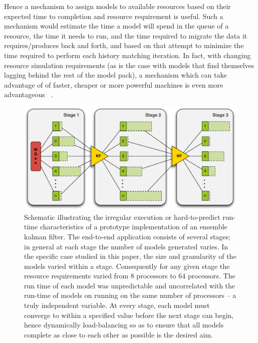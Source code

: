 \documentclass[conference,final]{IEEEtran}
\begin{document}
Hence a mechanism to assign models to available resources based on
their expected time to completion and resource requirement is useful.
Such a mechanism would estimate the time a model will spend in the
queue of a resource, the time it needs to run, and the time required
to migrate the data it requires/produces back and forth, and based on
that attempt to minimize the time required to perform each history
matching iteration.  In fact, with changing resource simulation
requirements (as is the case with models that find themselves lagging
behind the rest of the model pack), a mechanism which can take
advantage of of faster, cheaper or more powerful machines is even more
advantageous ~\cite{escience07}.

\begin{figure}
\begin{center}
\includegraphics*[scale=0.36,]{./figures/3StageKalmanFilter}
\end{center}
\caption{Schematic illustrating the irregular execution or
  hard-to-predict run-time characteristics of a prototype
  implementation of an ensemble kalman filter. The end-to-end
  application consists of several stages; in general at each stage the
  number of models generated varies. In the specific case studied in
  this paper, the size and granularity of the models varied within a
  stage. Consequently for any given stage the resource requirements
  varied from 8 processors to 64 processors.  The run time of each
  model was unpredictable and uncorrelated with the run-time of models
  on running on the same number of processors -- a truly independent
  variable. At every stage, each model must converge to within a
  specified value before the next stage can begin, hence dynamically
  load-balancing so as to ensure that all models complete as close to
  each other as possible is the desired aim.}
\label{fig:irregular_execution}
\end{figure}
\end{document}
